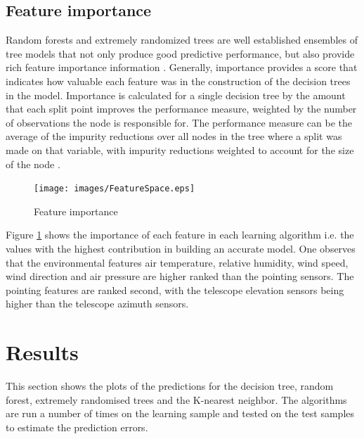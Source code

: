 \subsection{Feature importance}
Random forests and extremely randomized trees are well established ensembles of tree models that not only produce good predictive performance, but also provide rich feature importance information \citep{kazemitabar2017variable}. Generally, importance provides a score that indicates how  valuable each feature was in the construction of the decision trees in the model. Importance is calculated for a single decision tree by the amount that each split point improves the performance measure, weighted by the number of observations the node is responsible for. The performance measure can be the average of the impurity reductions over all nodes in the tree where a split was made on that variable, with impurity reductions weighted to account for the size of the node \citep{kazemitabar2017variable}.

\begin{figure}[H]
  \centering
    \texttt{[image: images/FeatureSpace.eps]}
    \caption{Feature importance}
    \label{FI}
\end{figure}
Figure \ref{FI} shows the importance of each feature in each learning algorithm i.e. the values with the highest contribution in building an accurate model. One observes that the environmental features air temperature, relative humidity, wind speed, wind direction and air pressure are higher ranked than the pointing sensors. The pointing features are ranked second, with the telescope elevation sensors being higher than the telescope azimuth sensors. 

\section{Results}
\label{sec3}
This section shows the plots of the predictions for the decision tree, random forest, extremely randomised trees and the K-nearest neighbor. The algorithms are run a number of times on the learning sample and tested on the test samples to estimate the prediction errors. 
